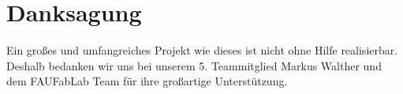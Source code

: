 \section{Danksagung}

Ein großes und umfangreiches Projekt wie dieses ist nicht ohne Hilfe realisierbar. Deshalb bedanken wir uns bei unserem 5. Teammitglied Markus Walther und dem FAUFabLab Team für ihre großartige Unterstützung.



